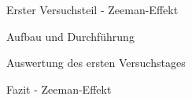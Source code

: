 \documentclass[pdftex, a4paper,11pt, twoside, ngerman]{report}
\begin{document}
\begin{chapter}{Erster Versuchsteil - Zeeman-Effekt}
\begin{section}{Aufbau und Durchführung}

    \end{section}
   
   
   
  
   
   
   
    \begin{section}{Auswertung des ersten Versuchstages}
      \label{chp:Photoeffekt:sec:Auswertung}
      
      
      
    \end{section}
   
   
   
    \begin{section}{Fazit - Zeeman-Effekt}
      \label{chp:Photoeffekt:sec:Fazit}
      
      
      
    \end{section}
   
  \end{chapter}
 
 
 
\end{document}
